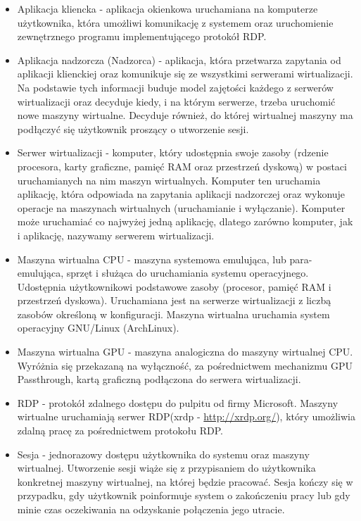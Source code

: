 \documentclass[../wstep.tex]{subfiles}
\begin{document}
\begin{itemize}
    \item Aplikacja kliencka - aplikacja okienkowa uruchamiana na komputerze użytkownika, która umożliwi komunikację z systemem oraz uruchomienie zewnętrznego programu implementującego protokół RDP.
    \item Aplikacja nadzorcza (Nadzorca) - aplikacja, która przetwarza zapytania od aplikacji klienckiej oraz komunikuje się ze wszystkimi serwerami wirtualizacji. Na podstawie tych informacji buduje model zajętości każdego z serwerów wirtualizacji oraz decyduje kiedy, i na którym serwerze, trzeba uruchomić nowe maszyny wirtualne. Decyduje również, do której wirtualnej maszyny ma podłączyć się użytkownik proszący o utworzenie sesji.
    \item Serwer wirtualizacji - komputer, który udostępnia swoje zasoby (rdzenie procesora, karty graficzne, pamięć RAM oraz przestrzeń dyskową) w postaci uruchamianych na nim maszyn wirtualnych. Komputer ten uruchamia aplikację, która odpowiada na zapytania aplikacji nadzorczej oraz wykonuje operacje na maszynach wirtualnych (uruchamianie i wyłączanie). Komputer może uruchamiać co najwyżej jedną aplikację, dlatego zarówno komputer, jak i aplikację, nazywamy serwerem wirtualizacji.
    \item Maszyna wirtualna CPU - maszyna systemowa emulująca, lub para-emulująca, sprzęt i służąca do uruchamiania systemu operacyjnego. Udostępnia użytkownikowi podstawowe zasoby (procesor, pamięć RAM i przestrzeń dyskowa). Uruchamiana jest na serwerze wirtualizacji z liczbą zasobów określoną w konfiguracji. Maszyna wirtualna uruchamia system operacyjny GNU/Linux (ArchLinux).
    \item Maszyna wirtualna GPU - maszyna analogiczna do maszyny wirtualnej CPU. Wyróżnia się przekazaną na wyłączność, za pośrednictwem mechanizmu GPU Passthrough, kartą graficzną podłączona do serwera wirtualizacji.
    \item RDP - protokół zdalnego dostępu do pulpitu od firmy Microsoft\parencite{rdp}. Maszyny wirtualne uruchamiają serwer RDP(xrdp - \url{http://xrdp.org/}), który umożliwia zdalną pracę za pośrednictwem protokołu RDP.
    \item Sesja - jednorazowy dostępu użytkownika do systemu oraz maszyny wirtualnej. Utworzenie sesji wiąże się z przypisaniem do użytkownika konkretnej maszyny wirtualnej, na której będzie pracować. Sesja kończy się w przypadku, gdy użytkownik poinformuje system o zakończeniu pracy lub gdy minie czas oczekiwania na odzyskanie połączenia jego utracie.

\end{itemize}
\end{document}
